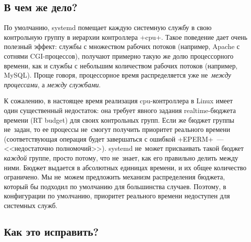\documentclass[10pt,oneside,a4paper]{article}
\begin{document}
\subsection*{В чем же дело?}

По умолчанию, systemd помещает каждую системную службу в свою контрольную группу
в иерархии контроллера +cpu+. Такое поведение дает очень полезный эффект: службы
с множеством рабочих потоков (например, Apache с сотнями CGI-процессов),
получают примерно такую же долю процессорного времени, как и службы с небольшим
количеством рабочих потоков (например, MySQL). Проще говоря, процессорное время
распределяется уже не~\emph{между процессами}, а \emph{между службами}.

К сожалению, в настоящее время реализация cpu-контроллера в Linux имеет один
существенный недостаток: она требует явного задания realtime-бюджета времени (RT
budget) для своих контрольных групп. Если же бюджет группы не~задан, то ее
процессы не~смогут получить приоритет реального времени (соответствующая
операция будет завершаться с ошибкой +EPERM+~--- <<недостаточно полномочий>>).
systemd не~может присваивать такой бюджет \emph{каждой} группе, просто потому,
что не~знает, как его правильно делить между ними. Бюджет выдается в абсолютных
единицах времени, и их общее количество ограничено. Мы не~можем предложить
механизм распределения бюджета, который бы подходил по умолчанию для большинства
случаев. Поэтому, в конфигурации по умолчанию, приоритет реального времени
недоступен для системных служб.

\subsection*{Как это исправить?}
\end{document}
